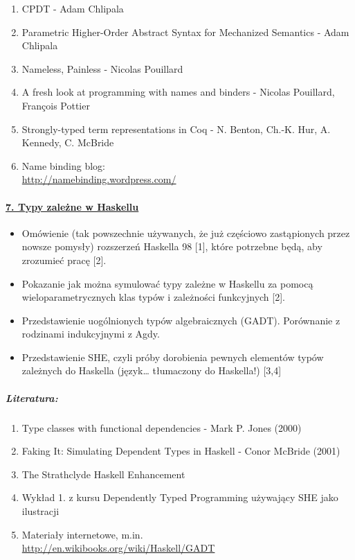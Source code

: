 \documentclass[10pt, a4paper]{article}
\begin{document}
\begin{enumerate}
\addtolength{\itemsep}{-0.5\baselineskip}
 \item CPDT - Adam Chlipala
 \item Parametric Higher-Order Abstract Syntax for Mechanized Semantics - Adam Chlipala
 \item Nameless, Painless - Nicolas Pouillard
 \item A fresh look at programming with names and binders - Nicolas Pouillard, François Pottier
 \item Strongly-typed term representations in Coq - N. Benton, Ch.-K. Hur, A. Kennedy, C. McBride
 \item Name binding blog: \\
       \url{http://namebinding.wordpress.com/}
\end{enumerate}

\paragraph{\underline{7. Typy zależne w Haskellu}}

\begin{itemize}
\addtolength{\itemsep}{-0.5\baselineskip}
 \item Omówienie (tak powszechnie używanych, że już częściowo zastąpionych przez nowsze pomysły) rozszerzeń Haskella 98 [1], które potrzebne będą, aby zrozumieć pracę [2].
 \item Pokazanie jak można symulować typy zależne w Haskellu za pomocą wieloparametrycznych klas typów i zależności funkcyjnych [2].
 \item Przedstawienie uogólnionych typów algebraicznych (GADT). Porównanie z rodzinami indukcyjnymi z Agdy.
 \item Przedstawienie SHE, czyli próby dorobienia pewnych elementów typów zależnych do Haskella (język… tłumaczony do Haskella!) [3,4]
\end{itemize}

\subparagraph{Literatura:}

\begin{enumerate}
\addtolength{\itemsep}{-0.5\baselineskip}

 \item Type classes with functional dependencies - Mark P. Jones (2000)
 \item Faking It: Simulating Dependent Types in Haskell - Conor McBride (2001) 
 \item The Strathclyde Haskell Enhancement
 \item Wykład 1. z kursu Dependently Typed Programming używający SHE jako ilustracji
 \item Materiały internetowe, m.in. \\
       \url{http://en.wikibooks.org/wiki/Haskell/GADT}

\end{enumerate}
\end{document}
